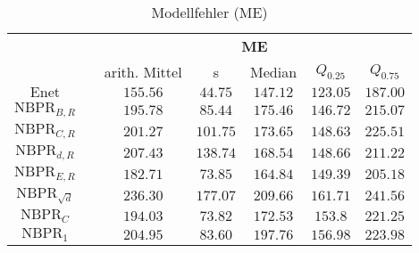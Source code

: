 \documentclass{beamer}
\begin{document}
\begin{frame}
\begin{table}[h]
\begin{tabular}{clccccc}
\multicolumn{1}{l}{}     &  & \multicolumn{5}{c}{\textbf{ME}}                               \\ \cline{3-7} 
\multicolumn{1}{l}{}     &  & arith. Mittel & s        & Median   & $Q_{0.25}$ & $Q_{0.75}$ \\ \cline{3-7} 
$\text{Enet}$            &  & $155.56$      & $44.75$  & $147.12$ & $123.05$   & $187.00$   \\
$\text{NBPR}_{B,R}$      &  & $195.78$      & $85.44$  & $175.46$ & $146.72$   & $215.07$   \\
$\text{NBPR}_{C,R}$      &  & $201.27$      & $101.75$ & $173.65$ & $148.63$   & $225.51$   \\
$\text{NBPR}_{d,R}$      &  & $207.43$      & $138.74$ & $168.54$ & $148.66$   & $211.22$   \\
$\text{NBPR}_{E,R}$      &  & $182.71$      & $73.85$  & $164.84$ & $149.39$   & $205.18$   \\
$\text{NBPR}_{\sqrt{d}}$ &  & $236.30$      & $177.07$ & $209.66$ & $161.71$   & $241.56$   \\
$\text{NBPR}_{C}$        &  & $194.03$      & $73.82$  & $172.53$ & $153.8$    & $221.25$   \\
$\text{NBPR}_{1}$        &  & $204.95$      & $83.60$  & $197.76$ & $156.98$   & $223.98$  
\end{tabular}
\caption{Modellfehler (ME)}
\end{table}
\end{frame}
\end{document}
